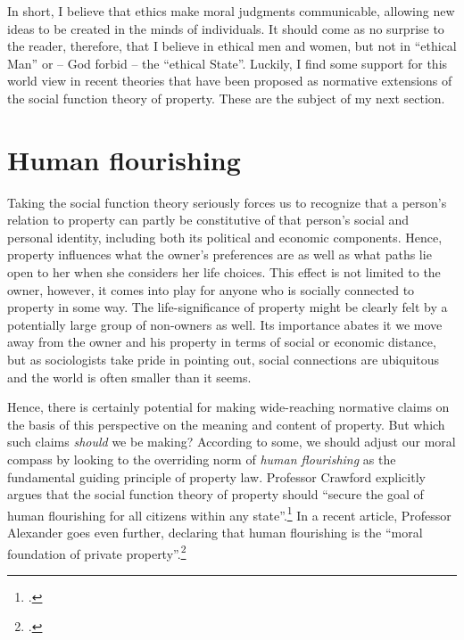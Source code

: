 In short, I believe that ethics make moral judgments communicable, allowing new ideas to be created in the minds of individuals. It should come as no surprise to the reader, therefore, that I believe in ethical men and women, but not in ``ethical Man'' or -- God forbid --  the ``ethical State''. Luckily, I find some support for this world view in recent theories that have been proposed as normative extensions of the social function theory of property. These are the subject of my next section.

\section{Human flourishing}

Taking the social function theory seriously forces us to recognize that a person's relation to property can partly be constitutive of that person's social and personal identity, including both its political and economic components. Hence, property influences what the owner's preferences are as well as what paths lie open to her when she considers her life choices. This effect is not limited to the owner, however, it comes into play for anyone who is socially connected to property in some way. The life-significance of property might be clearly felt by a potentially large group of non-owners as well. Its importance abates it we move away from the owner and his property in terms of social or economic distance, but as sociologists take pride in pointing out, social connections are ubiquitous  and the world is often smaller than it seems. 

Hence, there is certainly potential for making wide-reaching normative claims on the basis of this perspective on the meaning and content of property. But which such claims {\it should} we be making? According to some, we should adjust our moral compass by looking to the overriding norm of {\it human flourishing} as the fundamental guiding principle of property law. Professor Crawford explicitly argues that the social function theory of property should ``secure the goal of human flourishing for all citizens within any state''.\footcite[1089]{crawford12} In a recent article, Professor Alexander goes even further, declaring that human flourishing is the ``moral foundation of private property''.\footcite[1261]{alexander14} 

